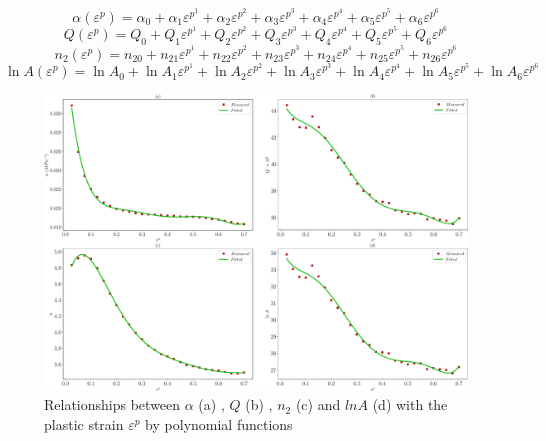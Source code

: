 \documentclass[twoside,english,1p,final,sort&compress]{elsarticle}
\theoremstyle{plain}
\begin{document}
\begin{equation}
\label{eq:alpha}
\alpha(\varepsilon^p) = \alpha_0 + \alpha_1\varepsilon^{{p^1}} + \alpha_2\varepsilon^{p^2} + \alpha_3\varepsilon^{p^3} + \alpha_4\varepsilon^{p^4} + \alpha_5\varepsilon^{p^5} + \alpha_6\varepsilon^{p^6}
\end{equation}
\begin{equation}
\label{eq:Q}
Q(\varepsilon^p) = Q_0 + Q_1\varepsilon^{{p^1}} + Q_2\varepsilon^{p^2} + Q_3\varepsilon^{p^3} + Q_4\varepsilon^{p^4} + Q_5\varepsilon^{p^5} + Q_6\varepsilon^{p^6}
\end{equation}
\begin{equation}
\label{eq:n}
n_2(\varepsilon^p) = n_{20} + n_{21}\varepsilon^{{p^1}} + n_{22}\varepsilon^{p^2} + n_{23}\varepsilon^{p^3} + n_{24}\varepsilon^{p^4} + n_{25}\varepsilon^{p^5} + n_{26}\varepsilon^{p^6}
\end{equation}
\begin{equation}
\label{eq:lnA}
\ln A(\varepsilon^p) = \ln A_0 + \ln A_1\varepsilon^{{p^1}} + \ln A_2\varepsilon^{p^2} + \ln A_3\varepsilon^{p^3} + \ln A_4\varepsilon^{p^4} + \ln A_5\varepsilon^{p^5} + \ln A_6\varepsilon^{p^6}
\end{equation}
\begin{figure}[!ht]
\centering
\includegraphics[width=1.02\columnwidth]{Figures/ARparameters}
\caption{Relationships between $\alpha$ (a)  , $Q$ (b) , $n_2$ (c)  and $lnA$ (d)  with the plastic strain $\varepsilon^p$ by polynomial functions}
\label{fig:ARparameters}
\end{figure}
\end{document}
